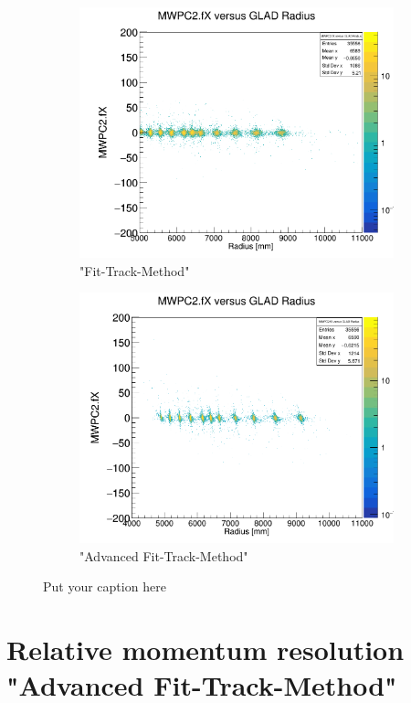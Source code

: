 \documentclass[12pt, letterpaper]{article}
\begin{document}
\begin{figure}[!htbp]
\begin{subfigure}{.5\textwidth}
\end{subfigure}
\begin{subfigure}{.5\textwidth}
  \centering
  \includegraphics[width=.9\linewidth]{plot_imgs/mw2_rho_fit.png} 
  \caption{"Fit-Track-Method"}
  \label{fig:sub-second}
\end{subfigure}
\begin{subfigure}{.5\textwidth}
  \centering
  \includegraphics[width=.9\linewidth]{plot_imgs/mw2_rho_last.png} 
  \caption{"Advanced Fit-Track-Method"}
  \label{fig:sub-second}
\end{subfigure}
\caption{Put your caption here}
\label{fig:fig}
\end{figure}
\FloatBarrier
\clearpage

\section{Relative momentum resolution "Advanced Fit-Track-Method"}
\end{document}
